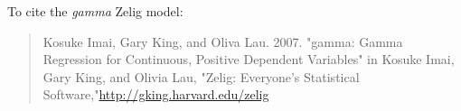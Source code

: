 To cite the \emph{ gamma } Zelig model:
 \begin{verse}
 Kosuke Imai, Gary King, and Oliva Lau. 2007. "gamma: Gamma Regression for Continuous, Positive Dependent Variables" in Kosuke Imai, Gary King, and Olivia Lau, "Zelig: Everyone's Statistical Software,"\url{http://gking.harvard.edu/zelig} 
\end{verse}